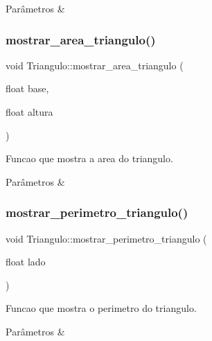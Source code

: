 \begin{DoxyParams}{Parâmetros}
{\em } & \\
\hline
\end{DoxyParams}
\mbox{\label{classTriangulo_a82082d7842eb3b9968b6a36d2eb99684}} 
\subsubsection{\texorpdfstring{mostrar\+\_\+area\+\_\+triangulo()}{mostrar\_area\_triangulo()}}
{\footnotesize\ttfamily void Triangulo\+::mostrar\+\_\+area\+\_\+triangulo (\begin{DoxyParamCaption}\item[{float}]{base,  }\item[{float}]{altura }\end{DoxyParamCaption})}



Funcao que mostra a area do triangulo. 


\begin{DoxyParams}{Parâmetros}
{\em } & \\
\hline
\end{DoxyParams}
\mbox{\label{classTriangulo_acd48a4eeff79b39b045d1f41aff72989}} 
\subsubsection{\texorpdfstring{mostrar\+\_\+perimetro\+\_\+triangulo()}{mostrar\_perimetro\_triangulo()}}
{\footnotesize\ttfamily void Triangulo\+::mostrar\+\_\+perimetro\+\_\+triangulo (\begin{DoxyParamCaption}\item[{float}]{lado }\end{DoxyParamCaption})}



Funcao que mostra o perimetro do triangulo. 


\begin{DoxyParams}{Parâmetros}
{\em } & \\
\hline
\end{DoxyParams}
\mbox{\label{classTriangulo_a9a4ee8d44d7ea23d118bbf9cc72157a2}} 
